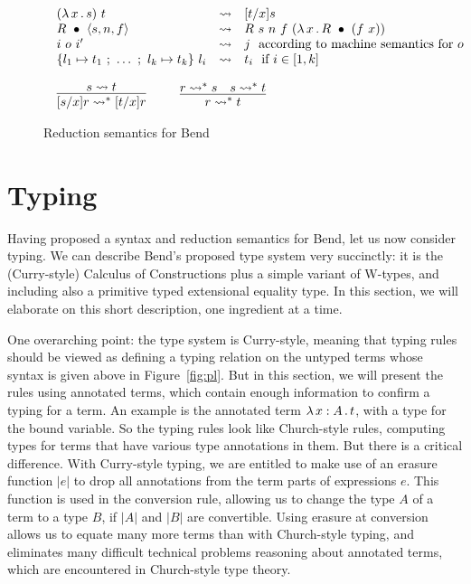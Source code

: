\documentclass{article}
\begin{document}
\begin{figure}
  \[
\begin{array}{l}
  \begin{array}{lll}
    (\lam{x}{s})\ t & \leadsto & [t/x]s \\
    \wrec{R}{\ctor{s}{n}{f}} & \leadsto & R\ s\ n\ f\ (\lam{x}{\wrec{R}{(f\ x)}}) \\
    i\ o\ i' & \leadsto & j\ \ \textnormal{according to machine semantics for }o \\
    \{ l_1 \mapsto t_1\ ;\ \ldots\ ;\ l_k\mapsto t_k \}\ l_i & \leadsto & t_i\ \ \textnormal{if } i\in[1,k]
  \end{array}
  \\ \\
  \begin{array}{lll}
  \infer{[s/x]r \leadsto^* [t/x]r}{s \leadsto t} &\ \ &
  \infer{r \leadsto^* t}{r \leadsto^* s & s \leadsto^* t}
  \end{array}
\end{array}  
\]
  \caption{Reduction semantics for Bend}
  \label{fig:opsem}
  \end{figure}

\section{Typing}
\label{sec:tp}

Having proposed a syntax and reduction semantics for Bend, let us now
consider typing.  We can describe Bend's proposed type system very
succinctly: it is the (Curry-style) Calculus of Constructions plus a
simple variant of W-types, and including also a primitive typed
extensional equality type.  In this section, we will elaborate on
this short description, one ingredient at a time.

One overarching point: the type system is Curry-style, meaning that
typing rules should be viewed as defining a typing relation on the
untyped terms whose syntax is given above in Figure~\ref{fig:pl}.  But
in this section, we will present the rules using annotated terms,
which contain enough information to confirm a typing for a term.  An
example is the annotated term $\lambda\, x : A\, .\, t$, with a type for the
bound variable.  So the typing rules look like Church-style rules,
computing types for terms that have various type annotations in them.
But there is a critical difference.  With Curry-style typing, we are
entitled to make use of an erasure function $|e|$ to drop all
annotations from the term parts of expressions $e$.  This function is
used in the conversion rule, allowing us to change the type $A$ of a
term to a type $B$, if $|A|$ and $|B|$ are convertible.  Using erasure
at conversion allows us to equate many more terms than with
Church-style typing, and eliminates many difficult technical problems
reasoning about annotated terms, which are encountered in Church-style
type theory.
\end{document}

